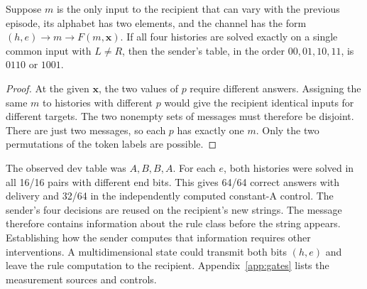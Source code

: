 \begin{proposition}
Suppose $m$ is the only input to the recipient that can vary with the previous episode, its alphabet has two elements, and the channel has the form $(h,e)\longrightarrow m\longrightarrow F(m,\mathbf{x})$. If all four histories are solved exactly on a single common input with $L\ne R$, then the sender's table, in the order $00,01,10,11$, is $0110$ or $1001$.
\end{proposition}
\begin{proof}
At the given $\mathbf{x}$, the two values of $p$ require different answers. Assigning the same $m$ to histories with different $p$ would give the recipient identical inputs for different targets. The two nonempty sets of messages must therefore be disjoint. There are just two messages, so each $p$ has exactly one $m$. Only the two permutations of the token labels are possible.
\end{proof}

The observed dev table was $A,B,B,A$. For each $e$, both histories were solved in all 16/16 pairs with different end bits. This gives 64/64 correct answers with delivery and 32/64 in the independently computed constant-A control. The sender's four decisions are reused on the recipient's new strings. The message therefore contains information about the rule class before the string appears. Establishing how the sender computes that information requires other interventions. A multidimensional state could transmit both bits $(h,e)$ and leave the rule computation to the recipient. Appendix~\ref{app:gates} lists the measurement sources and controls.
